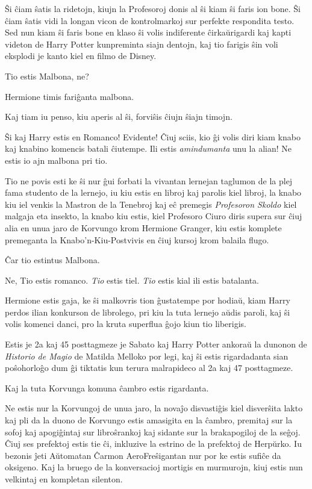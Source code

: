 Ŝi ĉiam ŝatis la ridetojn, kiujn la Profesoroj donis al ŝi kiam ŝi
faris ion bone. Ŝi ĉiam ŝatis vidi la longan vicon de kontrolmarkoj
sur perfekte respondita testo. Sed nun kiam ŝi faris bone en klaso ŝi
volis indiferente ĉirkaŭrigardi kaj kapti videton de Harry Potter
kunpreminta siajn dentojn, kaj tio farigis ŝin voli eksplodi je kanto
kiel en filmo de Disney.

Tio estis Malbona, ne?

Hermione timis fariĝanta malbona.

Kaj tiam iu penso, kiu aperis al ŝi, forviŝis ĉiujn ŝiajn timojn.

Ŝi kaj Harry estis en Romanco! Evidente! Ĉiuj sciis, kio ĝi volis diri
kiam knabo kaj knabino komencis batali ĉiutempe. Ili estis
\emph{amindumanta} unu la alian! Ne estis io ajn malbona pri tio.

Tio ne povis esti ke ŝi nur ĝui forbati la vivantan lernejan taglumon
de la plej fama studento de la lernejo, iu kiu estis en libroj kaj
parolis kiel libroj, la knabo kiu iel venkis la Mastron de la Tenebroj
kaj eĉ premegis \emph{Profesoron Skoldo} kiel malgaja eta insekto, la
knabo kiu estis, kiel Profesoro Ciuro diris supera sur ĉiuj alia en
unua jaro de Korvungo krom Hermione Granger, kiu estis komplete
premeganta la Knabo'n-Kiu-Postvivis en ĉiuj kursoj krom balaila flugo.

Ĉar tio estintus Malbona.

Ne, Tio estis romanco. \emph{Tio} estis tiel. \emph{Tio} estis kial
ili estis batalanta.

Hermione estis gaja, ke ŝi malkovris tion ĝustatempe por hodiaŭ, kiam
Harry perdos ilian konkurson de librolego, pri kiu la tuta lernejo
aŭdis paroli, kaj ŝi volis komenci danci, pro la kruta superflua ĝojo
kiun tio liberigis.

Estis je 2a kaj 45 posttagmeze je Sabato kaj Harry Potter ankoraŭ la
dunonon de \emph{Historio de Magio} de Matilda Melloko por legi, kaj
ŝi estis rigardadanta sian poŝohorloĝo dum ĝi tiktatis kun terura
malrapideco al 2a kaj 47 posttagmeze.

Kaj la tuta Korvunga komuna ĉambro estis rigardanta.

Ne estis nur la Korvungoj de unua jaro, la novaĵo disvastiĝis kiel
disverŝita lakto kaj pli da la duono de Korvungo estis amasigita en la
ĉambro, premitaj sur la sofoj kaj apogiĝintaj sur libroŝrankoj kaj
sidante sur la brakapogiloj de la seĝoj. Ĉiuj ses prefektoj estis tie
ĉi, inkluzive la estrino de la prefektoj de Herpŭrko. Iu bezonis ĵeti
Aŭtomatan Ĉarmon AeroFreŝigantan nur por ke estis sufiĉe da
oksigeno. Kaj la bruego de la konversacioj mortigis en murmurojn, kiuj
estis nun velkintaj en kompletan silenton.


